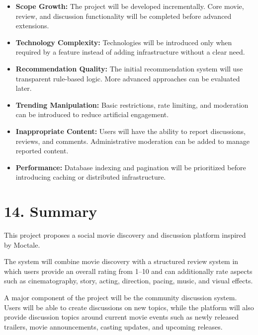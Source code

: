 \documentclass[11pt,a4paper]{article}
\begin{document}
\begin{itemize}

    \item \textbf{Scope Growth:}
    The project will be developed incrementally. Core movie, review, and discussion functionality will be completed before advanced extensions.

    \item \textbf{Technology Complexity:}
    Technologies will be introduced only when required by a feature instead of adding infrastructure without a clear need.

    \item \textbf{Recommendation Quality:}
    The initial recommendation system will use transparent rule-based logic. More advanced approaches can be evaluated later.

    \item \textbf{Trending Manipulation:}
    Basic restrictions, rate limiting, and moderation can be introduced to reduce artificial engagement.

    \item \textbf{Inappropriate Content:}
    Users will have the ability to report discussions, reviews, and comments. Administrative moderation can be added to manage reported content.

    \item \textbf{Performance:}
    Database indexing and pagination will be prioritized before introducing caching or distributed infrastructure.

\end{itemize}



\section{14. Summary}

This project proposes a social movie discovery and discussion platform inspired by Moctale.

The system will combine movie discovery with a structured review system in which users provide an overall rating from 1--10 and can additionally rate aspects such as cinematography, story, acting, direction, pacing, music, and visual effects.

A major component of the project will be the community discussion system. Users will be able to create discussions on new topics, while the platform will also provide discussion topics around current movie events such as newly released trailers, movie announcements, casting updates, and upcoming releases.
\end{document}

